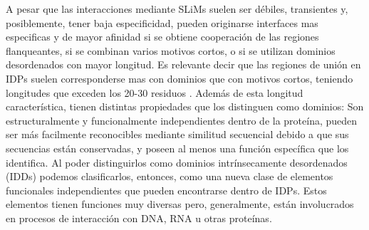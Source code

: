 





A pesar que las interacciones mediante SLiMs suelen ser débiles, transientes y, posiblemente, tener baja especificidad, pueden originarse interfaces mas especificas y de mayor afinidad si 
se obtiene cooperación de las regiones flanqueantes, si se combinan varios motivos cortos, o si se utilizan dominios desordenados con mayor longitud.
Es relevante decir que las regiones de unión en IDPs suelen corresponderse mas con dominios que con motivos cortos, teniendo longitudes que exceden los 20-30 residuos 
\cite{tompa2009close,chen2006conservation,chen2006conservationB}.  
Además de esta longitud característica, tienen distintas propiedades que los distinguen como dominios:
Son estructuralmente y funcionalmente independientes dentro de la proteína, pueden ser más facilmente reconocibles mediante similitud secuencial debido a que sus secuencias están conservadas, 
y poseen al menos una función específica que los identifica.
Al poder distinguirlos como dominios intrínsecamente desordenados (IDDs) podemos clasificarlos, entonces, como una nueva clase de elementos funcionales independientes que pueden encontrarse dentro de IDPs.
Estos elementos tienen funciones muy diversas pero, generalmente, están involucrados en procesos de interacción con DNA, RNA u otras proteínas.








































